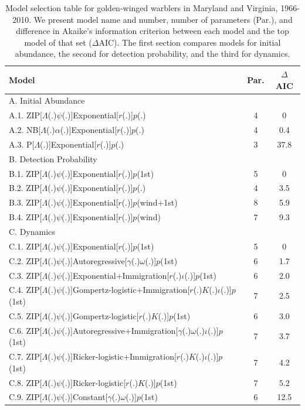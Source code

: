\documentclass[12pt]{article}
\begin{document}
\vfill
\newpage

\begin{table}
  \centering
  \small
  \caption{Model selection table for golden-winged
warblers in Maryland and Virginia, 1966-2010. We present model
name and number, number of parameters (Par.), and difference in
Akaike's information criterion between each model and the top model of
that set ($\Delta$AIC).  The first section compares
models for initial abundance, the second for detection
probability, and the third for dynamics.}
  \begin{tabular}[h]{lcc}
\hline
Model	&Par.	&$\Delta$AIC\\
\hline
A. Initial Abundance && \\
A.1. ZIP[$\Lambda$(.)$\psi$(.)]Exponential[$r$(.)]$p$(.)	&4	&0 \\
A.2. NB[$\Lambda$(.)$\alpha$(.)]Exponential[$r$(.)]$p$(.)	&4	&0.4 \\
A.3. P[$\Lambda$(.)]Exponential[$r$(.)]$p$(.)	&3	&37.8 \\
\hline
B. Detection Probability && \\
B.1. ZIP[$\Lambda$(.)$\psi$(.)]Exponential[$r$(.)]$p$(1st)	&5 &0 \\
B.2. ZIP[$\Lambda$(.)$\psi$(.)]Exponential[$r$(.)]$p$(.)	&4	&3.5 \\
B.3. ZIP[$\Lambda$(.)$\psi$(.)]Exponential[$r$(.)]$p$(wind+1st)	&8 &5.9 \\
B.4. ZIP[$\Lambda$(.)$\psi$(.)]Exponential[$r$(.)]$p$(wind) &7 &9.3\\
\hline
C. Dynamics && \\
C.1. ZIP[$\Lambda$(.)$\psi$(.)]Exponential[$r$(.)]$p$(1st) &5	&0 \\
C.2. ZIP[$\Lambda$(.)$\psi$(.)]Autoregressive[$\gamma$(.)$\omega$(.)]$p$(1st) &6	&1.7 \\
C.3. ZIP[$\Lambda$(.)$\psi$(.)]Exponential+Immigration[$r$(.)$\iota$(.)]$p$(1st) &6	&2.0 \\
C.4. ZIP[$\Lambda$(.)$\psi$(.)]Gompertz-logistic+Immigration[$r$(.)$K$(.)$\iota$(.)]$p$(1st) &7	&2.5 \\
C.5. ZIP[$\Lambda$(.)$\psi$(.)]Gompertz-logistic[$r$(.)$K$(.)]$p$(1st)	&6&3.0 \\
C.6. ZIP[$\Lambda$(.)$\psi$(.)]Autoregressive+Immigration[$\gamma$(.)$\omega$(.)$\iota$(.)]$p$(1st) &7	&3.7 \\
C.7. ZIP[$\Lambda$(.)$\psi$(.)]Ricker-logistic+Immigration[$r$(.)$K$(.)$\iota$(.)]$p$(1st) &7	&4.2 \\
C.8. ZIP[$\Lambda$(.)$\psi$(.)]Ricker-logistic[$r$(.)$K$(.)]$p$(1st)	&7 &5.2 \\
C.9. ZIP[$\Lambda$(.)$\psi$(.)]Constant[$\gamma$(.)$\omega$(.)]$p$(1st) &6	&12.5 \\
\hline
\end{tabular}
\end{table}
\end{document}
